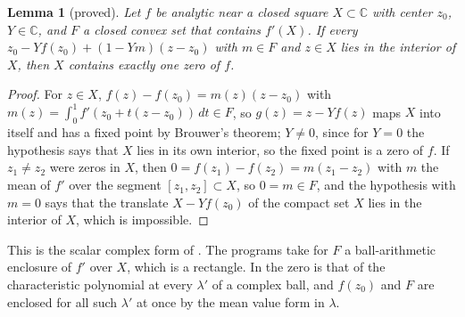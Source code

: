 \documentclass[11pt]{article}
\newtheorem{lemma}{Lemma}[section]
\theoremstyle{definition}
\newcommand{\C}{\mathbb{C}}
\begin{document}
\begin{lemma}[proved]\label{lem:krawczyk}
Let $f$ be analytic near a closed square $X \subset \C$ with center $z_0$, $Y \in \C$, and $F$ a closed convex set that contains $f'(X)$. If every $z_0 - Yf(z_0) + (1 - Ym)(z - z_0)$ with $m \in F$ and $z \in X$ lies in the interior of $X$, then $X$ contains exactly one zero of $f$.
\end{lemma}

\begin{proof}
For $z \in X$, $f(z) - f(z_0) = m(z)(z - z_0)$ with $m(z) = \int_0^1 f'(z_0 + t(z - z_0))\, dt \in F$, so $g(z) = z - Yf(z)$ maps $X$ into itself and has a fixed point by Brouwer's theorem; $Y \ne 0$, since for $Y = 0$ the hypothesis says that $X$ lies in its own interior, so the fixed point is a zero of $f$. If $z_1 \ne z_2$ were zeros in $X$, then $0 = f(z_1) - f(z_2) = m(z_1 - z_2)$ with $m$ the mean of $f'$ over the segment $[z_1, z_2] \subset X$, so $0 = m \in F$, and the hypothesis with $m = 0$ says that the translate $X - Yf(z_0)$ of the compact set $X$ lies in the interior of $X$, which is impossible.
\end{proof}

This is the scalar complex form of \cite[Theorem~13.3]{rump2010}. The programs take for $F$ a ball-arithmetic enclosure of $f'$ over $X$, which is a rectangle. In  the zero is that of the characteristic polynomial at every $\lambda'$ of a complex ball, and $f(z_0)$ and $F$ are enclosed for all such $\lambda'$ at once by the mean value form in $\lambda$.
\end{document}
